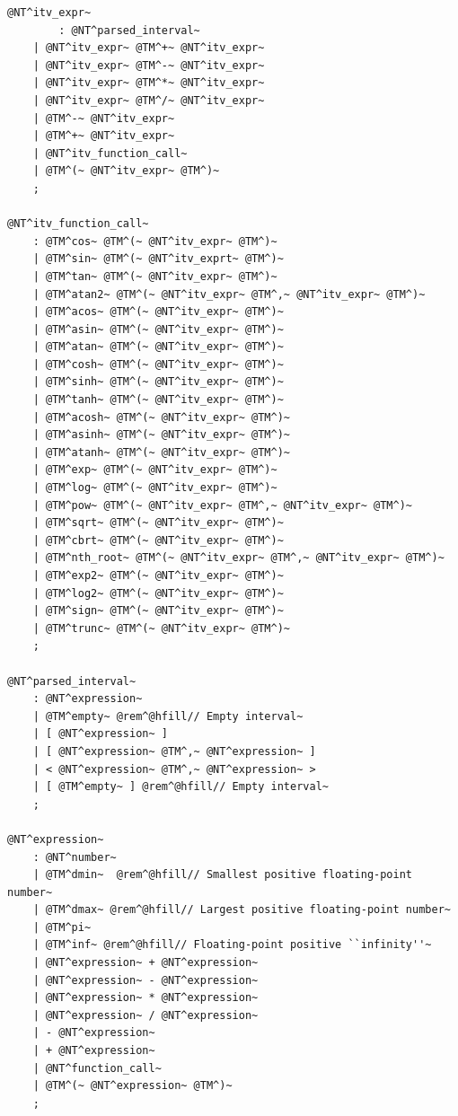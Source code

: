 \documentclass{manual}
\begin{document}
\begin{Verbatim}[commandchars=\@\^\~]
@NT^itv_expr~
        : @NT^parsed_interval~
	| @NT^itv_expr~ @TM^+~ @NT^itv_expr~
	| @NT^itv_expr~ @TM^-~ @NT^itv_expr~
	| @NT^itv_expr~ @TM^*~ @NT^itv_expr~
	| @NT^itv_expr~ @TM^/~ @NT^itv_expr~
	| @TM^-~ @NT^itv_expr~
	| @TM^+~ @NT^itv_expr~
	| @NT^itv_function_call~
	| @TM^(~ @NT^itv_expr~ @TM^)~
	;

@NT^itv_function_call~
	: @TM^cos~ @TM^(~ @NT^itv_expr~ @TM^)~
	| @TM^sin~ @TM^(~ @NT^itv_exprt~ @TM^)~
	| @TM^tan~ @TM^(~ @NT^itv_expr~ @TM^)~
	| @TM^atan2~ @TM^(~ @NT^itv_expr~ @TM^,~ @NT^itv_expr~ @TM^)~
	| @TM^acos~ @TM^(~ @NT^itv_expr~ @TM^)~
	| @TM^asin~ @TM^(~ @NT^itv_expr~ @TM^)~
	| @TM^atan~ @TM^(~ @NT^itv_expr~ @TM^)~
	| @TM^cosh~ @TM^(~ @NT^itv_expr~ @TM^)~
	| @TM^sinh~ @TM^(~ @NT^itv_expr~ @TM^)~
	| @TM^tanh~ @TM^(~ @NT^itv_expr~ @TM^)~
	| @TM^acosh~ @TM^(~ @NT^itv_expr~ @TM^)~
	| @TM^asinh~ @TM^(~ @NT^itv_expr~ @TM^)~
	| @TM^atanh~ @TM^(~ @NT^itv_expr~ @TM^)~
	| @TM^exp~ @TM^(~ @NT^itv_expr~ @TM^)~
	| @TM^log~ @TM^(~ @NT^itv_expr~ @TM^)~
	| @TM^pow~ @TM^(~ @NT^itv_expr~ @TM^,~ @NT^itv_expr~ @TM^)~
	| @TM^sqrt~ @TM^(~ @NT^itv_expr~ @TM^)~
	| @TM^cbrt~ @TM^(~ @NT^itv_expr~ @TM^)~
	| @TM^nth_root~ @TM^(~ @NT^itv_expr~ @TM^,~ @NT^itv_expr~ @TM^)~
	| @TM^exp2~ @TM^(~ @NT^itv_expr~ @TM^)~
	| @TM^log2~ @TM^(~ @NT^itv_expr~ @TM^)~
	| @TM^sign~ @TM^(~ @NT^itv_expr~ @TM^)~
	| @TM^trunc~ @TM^(~ @NT^itv_expr~ @TM^)~
	;

@NT^parsed_interval~
	: @NT^expression~
	| @TM^empty~ @rem^@hfill// Empty interval~
	| [ @NT^expression~ ]
	| [ @NT^expression~ @TM^,~ @NT^expression~ ]
	| < @NT^expression~ @TM^,~ @NT^expression~ >
	| [ @TM^empty~ ] @rem^@hfill// Empty interval~
	;

@NT^expression~
	: @NT^number~
	| @TM^dmin~  @rem^@hfill// Smallest positive floating-point number~
	| @TM^dmax~ @rem^@hfill// Largest positive floating-point number~
	| @TM^pi~
	| @TM^inf~ @rem^@hfill// Floating-point positive ``infinity''~
	| @NT^expression~ + @NT^expression~
	| @NT^expression~ - @NT^expression~
	| @NT^expression~ * @NT^expression~
	| @NT^expression~ / @NT^expression~
	| - @NT^expression~
	| + @NT^expression~
	| @NT^function_call~
	| @TM^(~ @NT^expression~ @TM^)~
	;


\end{Verbatim}
\end{document}

